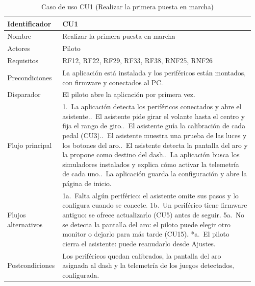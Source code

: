\clearpage   %
\begin{table}[H]
	\centering
	\renewcommand{\arraystretch}{1.5}
	\begin{tabular}{|l|p{10cm}|}
		\hline
		Identificador & CU1 \\
		\hline
		Nombre & Realizar la primera puesta en marcha \\
		\hline
		Actores & Piloto \\
		\hline
		Requisitos & RF12, RF22, RF29, RF33, RF38, RNF25, RNF26 \\
		\hline
		Precondiciones & La aplicación está instalada y los periféricos están montados, con firmware y conectados al PC. \\
		\hline
		Disparador & El piloto abre la aplicación por primera vez. \\
		\hline
		Flujo principal & 1.~La aplicación detecta los periféricos conectados y abre el asistente.\newline
		2.~El asistente pide girar el volante hasta el centro y fija el rango de giro.\newline
		3.~El asistente guía la calibración de cada pedal (CU3).\newline
		4.~El asistente muestra una prueba de las luces y los botones del aro.\newline
		5.~El asistente detecta la pantalla del aro y la propone como destino del dash.\newline
		6.~La aplicación busca los simuladores instalados y explica cómo activar la telemetría de cada uno.\newline
		7.~La aplicación guarda la configuración y abre la página de inicio. \\
		\hline
		Flujos alternativos & 1a.~Falta algún periférico: el asistente omite sus pasos y lo configura cuando se conecte.\newline
		1b.~Un periférico tiene firmware antiguo: se ofrece actualizarlo (CU5) antes de seguir.\newline
		5a.~No se detecta la pantalla del aro: el piloto puede elegir otro monitor o dejarlo para más tarde (CU15).\newline
		*a.~El piloto cierra el asistente: puede reanudarlo desde Ajustes. \\
		\hline
		Postcondiciones & Los periféricos quedan calibrados, la pantalla del aro asignada al dash y la telemetría de los juegos detectados, configurada. \\
		\hline
	\end{tabular}
	\caption{Caso de uso CU1 (Realizar la primera puesta en marcha)}
	\label{tab:cu1}
\end{table}

